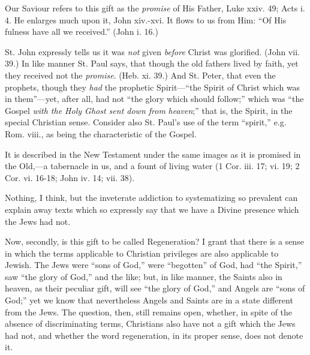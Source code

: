Our Saviour refers to this gift as the \emph{promise}
of His Father, Luke xxiv. 49; Acts i. 4. He enlarges much upon it,
John xiv.-xvi. It flows to us from Him: ``Of His fulness have all we
received.'' (John i. 16.)

St. John expressly tells us it was \emph{not}
given \emph{before} Christ was glorified. (John vii. 39.) In like
manner St. Paul says, that though the old fathers lived by faith, yet
they received not the \emph{promise}. (Heb. xi. 39.) And St. Peter,
that even the prophets, though they \emph{had} the prophetic Spirit—``the
Spirit of Christ which was in them''—yet, after all, had not ``the
glory which should follow;'' which was ``the Gospel \emph{with the Holy
Ghost sent down from} \emph{heaven};'' that is, the Spirit, in
the special Christian sense. Consider also St. Paul's use of the term
``spirit,'' e.g. Rom. viii., as being the characteristic of the
Gospel.

It is described in the New Testament under the
same images as it is promised in the Old,—a tabernacle in us, and a
fount of living water (1 Cor. iii. 17; vi. 19; 2 Cor. vi. 16-18; John
iv. 14; vii. 38).

Nothing, I think, but the inveterate addiction to
systematizing so prevalent can explain away texts which so expressly
say that we have a Divine presence which the Jews had not.

Now, secondly, is this gift to be called
Regeneration? I grant that there is a sense in which the terms
applicable to Christian privileges are also applicable to Jewish. The
Jews were ``sons of God,'' were ``begotten'' of God, had ``the Spirit,'' saw ``the
glory of God,'' and the like; but, in like manner, the Saints also in
heaven, as their peculiar gift, will see ``the glory of God,'' and
Angels are ``sons of God;'' yet we know that nevertheless Angels and
Saints are in a state different from the Jews. The question, then,
still remains open, whether, in spite of the absence of discriminating
terms, Christians also have not a gift which the Jews had not, and
whether the word regeneration, in its proper sense, does not denote
it.

